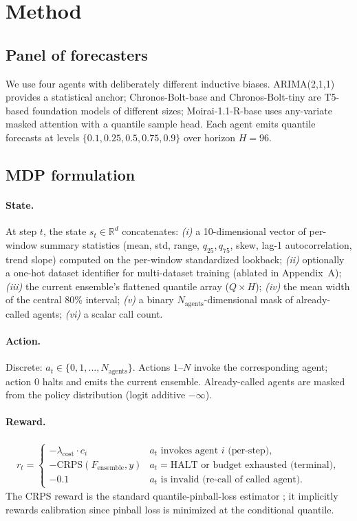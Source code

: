 \documentclass{article}
\begin{document}
\section{Method}
\label{sec:method}

\subsection{Panel of forecasters}
\label{sec:panel}

We use four agents with deliberately different inductive biases.
ARIMA(2,1,1) provides a statistical anchor; Chronos-Bolt-base and
Chronos-Bolt-tiny are T5-based foundation models of different sizes;
Moirai-1.1-R-base uses any-variate masked attention with a quantile
sample head. Each agent emits quantile forecasts at levels
$\{0.1, 0.25, 0.5, 0.75, 0.9\}$ over horizon $H=96$.

\subsection{MDP formulation}
\label{sec:mdp}

\paragraph{State.}
At step $t$, the state $s_t \in \mathbb{R}^{d}$ concatenates:
\emph{(i)} a 10-dimensional vector of per-window summary statistics
(mean, std, range, $q_{25}, q_{75}$, skew, lag-1 autocorrelation,
trend slope) computed on the per-window standardized lookback;
\emph{(ii)} optionally a one-hot dataset identifier for multi-dataset
training (ablated in Appendix~A);
\emph{(iii)} the current ensemble's flattened quantile array
($Q \times H$);
\emph{(iv)} the mean width of the central 80\% interval;
\emph{(v)} a binary $N_{\text{agents}}$-dimensional mask of
already-called agents;
\emph{(vi)} a scalar call count.

\paragraph{Action.}
Discrete: $a_t \in \{0, 1, \ldots, N_{\text{agents}}\}$. Actions
$1$--$N$ invoke the corresponding agent; action $0$ halts and emits
the current ensemble. Already-called agents are masked from the
policy distribution (logit additive $-\infty$).

\paragraph{Reward.}
\begin{align}
r_t = \begin{cases}
-\lambda_{\text{cost}} \cdot c_i & a_t \text{ invokes agent } i \text{ (per-step)}, \\
-\text{CRPS}(F_{\text{ensemble}}, y) & a_t = \text{HALT or budget exhausted (terminal)}, \\
-0.1 & a_t \text{ is invalid (re-call of called agent)}.
\end{cases}
\end{align}
The CRPS reward is the standard quantile-pinball-loss estimator
\cite{matheson1976scoring}; it implicitly rewards calibration since
pinball loss is minimized at the conditional quantile.
\end{document}
